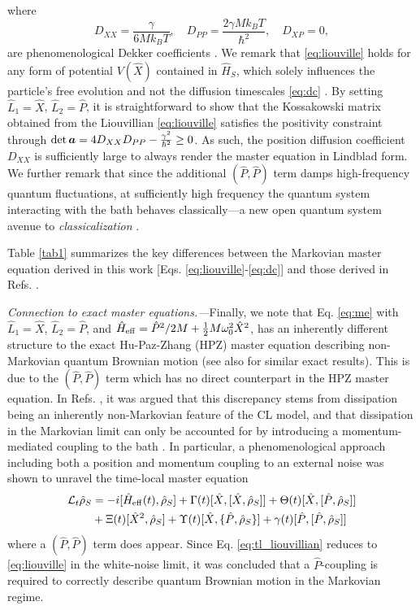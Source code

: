 \documentclass[prl,twocolumn,superscriptaddress,amsmath,amssymb]{revtex4-2}
\def\be{\begin{equation}}
\def\ee{\end{equation}}
\newcommand{\hb}{\hbar}
\begin{document}
where
\be\label{eq:dc}
	D_{XX} = \frac{\gamma}{6Mk_BT}, \quad D_{PP} = \frac{2\gamma Mk_BT}{\hb^2}, \quad D_{XP} = 0,
\ee
are phenomenological Dekker coefficients \cite{Dekker1977,Dekker1981}. We remark that \eqref{eq:liouville} holds for any form of potential $V(\hat{X})$ contained in $\hat{H}_S$, which solely influences the particle's free evolution and not the diffusion timescales \eqref{eq:dc} \cite{AlickiLendi2007}. By setting $\hat{L}_1=\hat{X}$, $\hat{L}_2=\hat{P}$, it is straightforward to show that the Kossakowski matrix obtained from the Liouvillian \eqref{eq:liouville} satisfies the positivity constraint through ${\rm det}\,\boldsymbol{a} = 4D_{XX}D_{PP} - \frac{\gamma^2}{\hb^2} \geq0$. As such, the position diffusion coefficient $D_{XX}$ is sufficiently large to always render the master equation in Lindblad form. We further remark that since the additional $(\hat{P},\hat{P})$ term damps high-frequency quantum fluctuations, at sufficiently high frequency the quantum system interacting with the bath behaves classically---a new open quantum system avenue to \textit{classicalization} \cite{Dvali2011}.

Table \ref{tab1} summarizes the key differences between the Markovian master equation derived in this work [Eqs. \eqref{eq:liouville}-\eqref{eq:dc}] and those derived in Refs. \cite{Diosi1993,Diosi1993a,CaldeiraLeggettA,BP2002}. %

{\it Connection to exact master equations.---}Finally, we note that Eq. \eqref{eq:me} with $\hat{L}_1=\hat{X}$, $\hat{L}_2=\hat{P}$, and $\hat{H}_{\rm eff}=\hat{P}^2/2M + \frac{1}{2}M\omega^2_0\hat{X}^2$, has an inherently different structure to the exact Hu-Paz-Zhang (HPZ) master equation \cite{Hu1992} describing non-Markovian quantum Brownian motion (see also \cite{Strunz1996,DiosiStrunz1997,DiosiGisinStrunz1998,Yu2004,StrunzYu2004,DiosiFerialdi2014,Ferialdi2016} for similar exact results). This is due to the $(\hat{P},\hat{P})$ term which has no direct counterpart in the HPZ master equation. In Refs. \cite{Ferialdi2016,Ferialdi2017}, it was argued that this discrepancy stems from dissipation being an inherently non-Markovian feature of the CL model, and that dissipation in the Markovian limit can only be accounted for 
by introducing a momentum-mediated coupling to the bath \cite{Diosi1995,Halliwell1995,Gao1997,Vacchini2000}. In particular, a phenomenological approach including both a position and momentum coupling to an external noise was shown to unravel the time-local master equation \cite{Ferialdi2016}
\begin{align}\label{eq:tl_liouvillian}
    \mathcal{L}_t\hat{\rho}_S &= -i[\hat{H}_{\rm eff}(t),\hat{\rho}_S] + \Gamma(t)[\hat{X},[\hat{X},\hat{\rho}_S]] + \Theta(t)[\hat{X},[\hat{P},\hat{\rho}_S]] \nonumber\\
    &+ \Xi(t)[\hat{X}^2,\hat{\rho}_S] + \Upsilon(t)[\hat{X},\{\hat{P},\hat{\rho}_S\}] + \gamma(t)[\hat{P},[\hat{P},\hat{\rho}_S]]
\end{align}
where a $(\hat{P},\hat{P})$ term does appear. Since Eq. \eqref{eq:tl_liouvillian} reduces to \eqref{eq:liouville} in the white-noise limit, it was concluded that a $\hat{P}$-coupling is required to correctly describe quantum Brownian motion in the Markovian regime.
\end{document}
